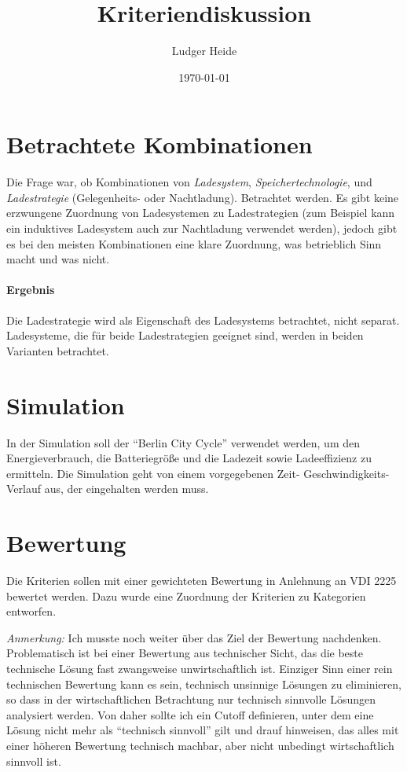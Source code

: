 \documentclass{scrartcl}
\title{Kriteriendiskussion}
\date{\today}
\author{Ludger Heide}
\begin{document}

\maketitle



\section{Betrachtete Kombinationen}
Die Frage war, ob Kombinationen von \emph{Ladesystem}, \emph{Speichertechnologie}, und \emph{Ladestrategie} (Gelegenheits- oder Nachtladung). Betrachtet werden. Es gibt keine erzwungene Zuordnung von Ladesystemen zu Ladestrategien (zum Beispiel kann ein induktives Ladesystem auch zur Nachtladung verwendet werden), jedoch gibt es bei den meisten Kombinationen eine klare Zuordnung, was betrieblich Sinn macht und was nicht.

\paragraph{Ergebnis} Die Ladestrategie wird als Eigenschaft des Ladesystems betrachtet, nicht separat. Ladesysteme, die für beide Ladestrategien geeignet sind, werden in beiden Varianten betrachtet.

\section{Simulation}
In der Simulation soll der "`Berlin City Cycle"' verwendet werden, um den Energieverbrauch, die Batteriegröße und die Ladezeit sowie Ladeeffizienz zu ermitteln. Die Simulation geht von einem vorgegebenen Zeit- Geschwindigkeits-Verlauf aus, der eingehalten werden muss.

\section{Bewertung}
Die Kriterien sollen mit einer gewichteten Bewertung in Anlehnung an VDI 2225 bewertet werden. Dazu wurde eine Zuordnung der Kriterien zu Kategorien entworfen.

\emph{Anmerkung:} Ich musste noch weiter über das Ziel der Bewertung nachdenken. Problematisch ist bei einer Bewertung aus technischer Sicht, das die beste technische Lösung fast zwangsweise unwirtschaftlich ist. Einziger Sinn einer rein technischen Bewertung kann es sein, technisch unsinnige Lösungen zu eliminieren, so dass in der wirtschaftlichen Betrachtung nur technisch sinnvolle Lösungen analysiert werden. Von daher sollte ich ein Cutoff definieren, unter dem eine Lösung nicht mehr als "`technisch sinnvoll"' gilt und drauf hinweisen, das alles mit einer höheren Bewertung technisch machbar, aber nicht unbedingt wirtschaftlich sinnvoll ist.
\end{document}
